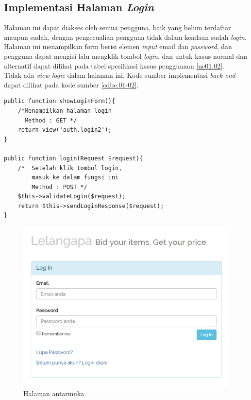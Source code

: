 \subsection{Implementasi Halaman \textit{Login}}
Halaman ini dapat diakses oleh semua pengguna, baik yang belum terdaftar maupun sudah, dengan pengecualian pengguna tidak dalam keadaan sudah \textit{login}. Halaman ini menampilkan form berisi elemen \textit{input} email dan \textit{password}, dan pengguna dapat mengisi lalu mengklik tombol \textit{login}, dan untuk kasus normal dan alternatif dapat dilihat pada tabel spesifikasi kasus penggunaan \ref{uc01.02}.\\
\indent Tidak ada \textit{view logic} dalam halaman ini. Kode sumber implementasi \textit{back-end} dapat dilihat pada kode sumber \ref{cdbe.01-02}.

\begin{lstlisting}[label=cdbe.01-02,style=php,caption=Kode Sumber Antarmuka Registrasi]
public function showLoginForm(){
	/*Menampilkan halaman login
	  Method : GET */
	return view('auth.login2');
}

public function login(Request $request){
	/*	Setelah klik tombol login,
		masuk ke dalam fungsi ini
		Method : POST */
	$this->validateLogin($request);
	return $this->sendLoginResponse($request);
}

\end{lstlisting}

\begin{figure}[H]
	\centering
	\includegraphics[width=\textwidth]{images/bab4/ui/01-02.png}
	\caption{Halaman antarmuka }
	\label{ui.01-01}
\end{figure}

